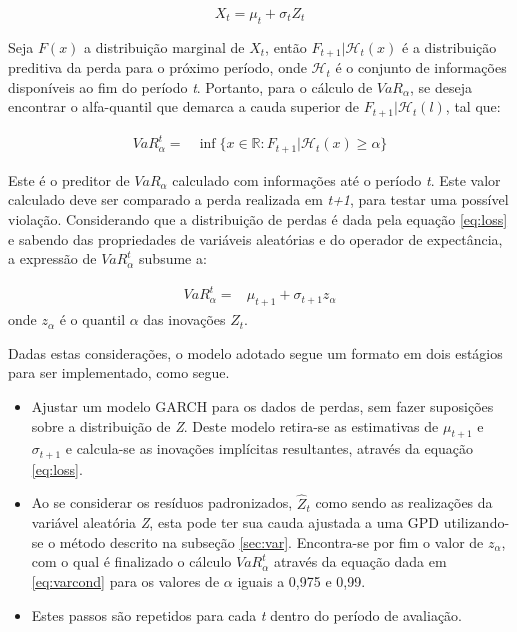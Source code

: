 \documentclass[1p]{elsarticle}
\theoremstyle{definition}
\begin{document}
\begin{equation}
\label{eq:loss}
X_t=\mu_t+\sigma_t Z_t
\end{equation}

Seja $F(x)$ a distribuição marginal de $X_t$, então $F_{t+1} | \mathcal{H}_t(x)$ é a distribuição preditiva da perda para o próximo período, onde $\mathcal{H}_t$ é o conjunto de informações disponíveis ao fim do período \emph{t}. Portanto, para o cálculo de $VaR_\alpha$, se deseja encontrar o alfa-quantil que demarca a cauda superior de $F_{t+1} | \mathcal{H}_t(l)$, tal que: 

\begin{align}
VaR_\alpha^t=&\inf\{x \in \mathbb{R}: F_{t+1} | \mathcal{H}_t(x) \geq \alpha\}
\end{align}

Este é o preditor de $VaR_\alpha$ calculado com informações até o período \emph{t}. Este valor calculado deve ser comparado a perda realizada em \emph{t+1}, para testar uma possível violação.
Considerando que a distribuição de perdas é dada pela equação \eqref{eq:loss} e sabendo das propriedades de variáveis aleatórias e do operador de expectância, a expressão de $VaR_\alpha^t$ subsume a:

\begin{align}
\label{eq:varcond} 
VaR_\alpha^t=&\mu_{t+1}+\sigma_{t+1}z_\alpha 
\end{align}
onde $z_\alpha$ é o quantil $\alpha$ das inovações $Z_t$.

Dadas estas considerações, o modelo adotado segue um formato em dois estágios para ser implementado, como segue.
\begin{itemize}
	\item Ajustar um modelo GARCH para os dados de perdas, sem fazer suposições sobre a distribuição de \emph{Z}. Deste modelo retira-se as estimativas de $\mu_{t+1}$ e $\sigma_{t+1}$ e calcula-se as inovações implícitas resultantes, através da equação \eqref{eq:loss}.
	\item Ao se considerar os resíduos padronizados, $\hat{Z}_t$ como sendo as realizações da variável aleatória \emph{Z}, esta pode ter sua cauda ajustada a uma GPD utilizando-se o método descrito na subseção \ref{sec:var}. Encontra-se por fim o valor de $z_\alpha$, com o qual é finalizado o cálculo $VaR_\alpha^t$ através da equação dada em \eqref{eq:varcond} para os valores de $\alpha$ iguais a 0,975 e 0,99.
	\item Estes passos são repetidos para cada \emph{t} dentro do período de avaliação.
\end{itemize}
\end{document}
